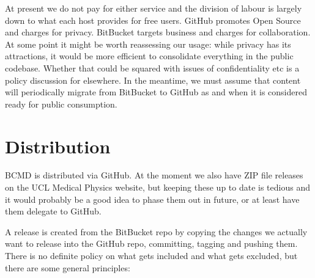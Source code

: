 \documentclass[a4paper,11pt]{article}
\begin{document}
At present we do not pay for either service and the division of labour is largely down to what each host provides for free users. GitHub promotes Open Source and charges for privacy. BitBucket targets business and charges for collaboration. At some point it might be worth reassessing our usage: while privacy has its attractions, it would be more efficient to consolidate everything in the public codebase. Whether that could be squared with issues of confidentiality etc is a policy discussion for elsewhere. In the meantime, we must assume that content will periodically migrate from BitBucket to GitHub as and when it is considered ready for public consumption.

\section{Distribution}\label{dist}

BCMD is distributed via GitHub. At the moment we also have ZIP file releases on the UCL Medical Physics website, but keeping these up to date is tedious and it would probably be a good idea to phase them out in future, or at least have them delegate to GitHub.

A release is created from the BitBucket repo by copying the changes we actually want to release into the GitHub repo, committing, tagging and pushing them. There is no definite policy on what gets included and what gets excluded, but there are some general principles:
\end{document}

